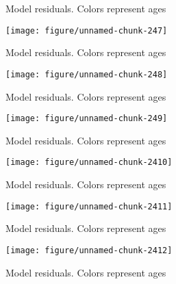 \documentclass[a4paper]{article}\usepackage{graphicx, color}
\makeatletter
\def\maxwidth{ %
  \ifdim\Gin@nat@width>\linewidth
    \linewidth
  \else
    \Gin@nat@width
  \fi
}
\newenvironment{knitrout}{}{} %
\makeatother
\begin{document}
\begin{knitrout}
\begin{figure}[H]
{}

\caption[Model residuals]{Model residuals. Colors represent ages\label{fig:unnamed-chunk-246}}
\end{figure}
\begin{figure}[H]


{\centering \texttt{[image: figure/unnamed-chunk-247]} 

}

\caption[Model residuals]{Model residuals. Colors represent ages\label{fig:unnamed-chunk-247}}
\end{figure}
\begin{figure}[H]


{\centering \texttt{[image: figure/unnamed-chunk-248]} 

}

\caption[Model residuals]{Model residuals. Colors represent ages\label{fig:unnamed-chunk-248}}
\end{figure}
\begin{figure}[H]


{\centering \texttt{[image: figure/unnamed-chunk-249]} 

}

\caption[Model residuals]{Model residuals. Colors represent ages\label{fig:unnamed-chunk-249}}
\end{figure}
\begin{figure}[H]


{\centering \texttt{[image: figure/unnamed-chunk-2410]} 

}

\caption[Model residuals]{Model residuals. Colors represent ages\label{fig:unnamed-chunk-2410}}
\end{figure}
\begin{figure}[H]


{\centering \texttt{[image: figure/unnamed-chunk-2411]} 

}

\caption[Model residuals]{Model residuals. Colors represent ages\label{fig:unnamed-chunk-2411}}
\end{figure}
\begin{figure}[H]


{\centering \texttt{[image: figure/unnamed-chunk-2412]} 

}

\caption[Model residuals]{Model residuals. Colors represent ages\label{fig:unnamed-chunk-2412}}
\end{figure}
\begin{figure}[H]



\end{figure}
\end{knitrout}
\end{document}
